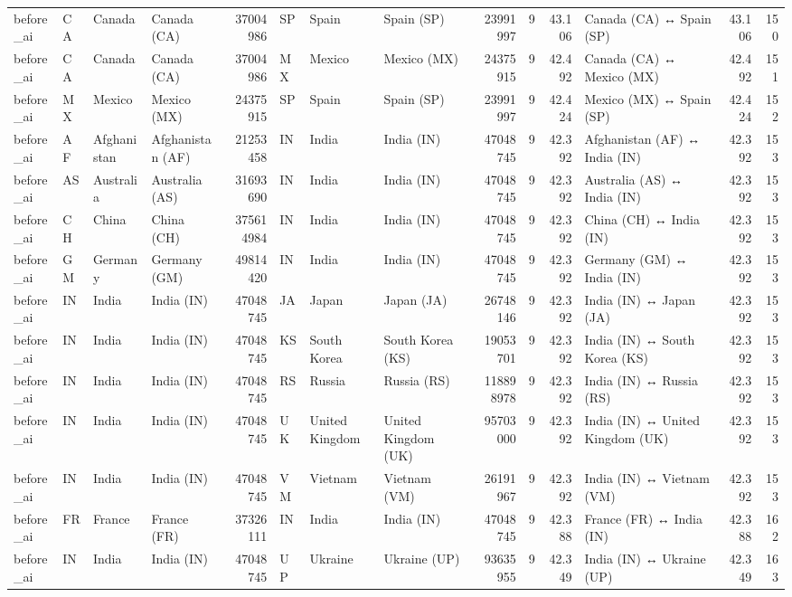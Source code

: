 \begin{tabular}{llllrlllrrrlrr}
before\_ai & CA & Canada & Canada (CA) & 37004986 & SP & Spain & Spain (SP) & 23991997 & 9 & 43.106 & Canada (CA) ↔ Spain (SP) & 43.106 & 150 \\
before\_ai & CA & Canada & Canada (CA) & 37004986 & MX & Mexico & Mexico (MX) & 24375915 & 9 & 42.492 & Canada (CA) ↔ Mexico (MX) & 42.492 & 151 \\
before\_ai & MX & Mexico & Mexico (MX) & 24375915 & SP & Spain & Spain (SP) & 23991997 & 9 & 42.424 & Mexico (MX) ↔ Spain (SP) & 42.424 & 152 \\
before\_ai & AF & Afghanistan & Afghanistan (AF) & 21253458 & IN & India & India (IN) & 47048745 & 9 & 42.392 & Afghanistan (AF) ↔ India (IN) & 42.392 & 153 \\
before\_ai & AS & Australia & Australia (AS) & 31693690 & IN & India & India (IN) & 47048745 & 9 & 42.392 & Australia (AS) ↔ India (IN) & 42.392 & 153 \\
before\_ai & CH & China & China (CH) & 375614984 & IN & India & India (IN) & 47048745 & 9 & 42.392 & China (CH) ↔ India (IN) & 42.392 & 153 \\
before\_ai & GM & Germany & Germany (GM) & 49814420 & IN & India & India (IN) & 47048745 & 9 & 42.392 & Germany (GM) ↔ India (IN) & 42.392 & 153 \\
before\_ai & IN & India & India (IN) & 47048745 & JA & Japan & Japan (JA) & 26748146 & 9 & 42.392 & India (IN) ↔ Japan (JA) & 42.392 & 153 \\
before\_ai & IN & India & India (IN) & 47048745 & KS & South Korea & South Korea (KS) & 19053701 & 9 & 42.392 & India (IN) ↔ South Korea (KS) & 42.392 & 153 \\
before\_ai & IN & India & India (IN) & 47048745 & RS & Russia & Russia (RS) & 118898978 & 9 & 42.392 & India (IN) ↔ Russia (RS) & 42.392 & 153 \\
before\_ai & IN & India & India (IN) & 47048745 & UK & United Kingdom & United Kingdom (UK) & 95703000 & 9 & 42.392 & India (IN) ↔ United Kingdom (UK) & 42.392 & 153 \\
before\_ai & IN & India & India (IN) & 47048745 & VM & Vietnam & Vietnam (VM) & 26191967 & 9 & 42.392 & India (IN) ↔ Vietnam (VM) & 42.392 & 153 \\
before\_ai & FR & France & France (FR) & 37326111 & IN & India & India (IN) & 47048745 & 9 & 42.388 & France (FR) ↔ India (IN) & 42.388 & 162 \\
before\_ai & IN & India & India (IN) & 47048745 & UP & Ukraine & Ukraine (UP) & 93635955 & 9 & 42.349 & India (IN) ↔ Ukraine (UP) & 42.349 & 163 \\

\end{tabular}
